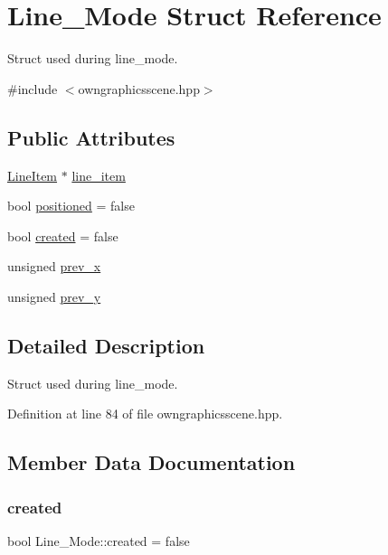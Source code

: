 \hypertarget{structLine__Mode}{}\section{Line\+\_\+\+Mode Struct Reference}
\label{structLine__Mode}


Struct used during line\+\_\+mode.  




{\ttfamily \#include $<$owngraphicsscene.\+hpp$>$}

\subsection*{Public Attributes}
\begin{DoxyCompactItemize}
\item 
\mbox{\hyperlink{classLineItem}{Line\+Item}} $\ast$ \mbox{\hyperlink{structLine__Mode_a4e11b31f28505579f3dfcde54b27ecac}{line\+\_\+item}}
\item 
bool \mbox{\hyperlink{structLine__Mode_aefbb8555f406d47d742491003a6afde1}{positioned}} = false
\item 
bool \mbox{\hyperlink{structLine__Mode_ae48257668288a2a284bef66727fa68e5}{created}} = false
\item 
unsigned \mbox{\hyperlink{structLine__Mode_a8bbcbaff29a7810e066e99174e562371}{prev\+\_\+x}}
\item 
unsigned \mbox{\hyperlink{structLine__Mode_a8d5fb940f686955ead3f368a8d3b9016}{prev\+\_\+y}}
\end{DoxyCompactItemize}


\subsection{Detailed Description}
Struct used during line\+\_\+mode. 

Definition at line 84 of file owngraphicsscene.\+hpp.



\subsection{Member Data Documentation}
\mbox{\label{structLine__Mode_ae48257668288a2a284bef66727fa68e5}} 
\subsubsection{\texorpdfstring{created}{created}}
{\footnotesize\ttfamily bool Line\+\_\+\+Mode\+::created = false}


